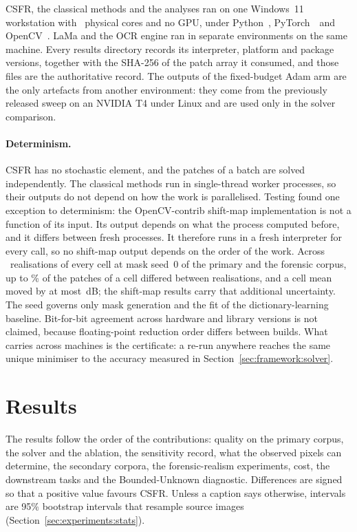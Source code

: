 \documentclass[final,3p]{elsarticle}
\begin{document}
CSFR, the classical methods and the analyses ran on one Windows~11 workstation with \envCores\ physical cores and no GPU, under Python~\envPython, PyTorch~\envTorch\ and OpenCV~\envOpencv. LaMa and the OCR engine ran in separate environments on the same machine. Every results directory records its interpreter, platform and package versions, together with the SHA-256 of the patch array it consumed, and those files are the authoritative record. The outputs of the fixed-budget Adam arm are the only artefacts from another environment: they come from the previously released sweep on an NVIDIA T4 under Linux and are used only in the solver comparison.

\paragraph{Determinism.} CSFR has no stochastic element, and the patches of a batch are solved independently. The classical methods run in single-thread worker processes, so their outputs do not depend on how the work is parallelised. Testing found one exception to determinism: the OpenCV-contrib shift-map implementation is not a function of its input. Its output depends on what the process computed before, and it differs between fresh processes. It therefore runs in a fresh interpreter for every call, so no shift-map output depends on the order of the work. Across \shiftmapRealisations\ realisations of every cell at mask seed~0 of the primary and the forensic corpus, up to \shiftmapDifferMax\% of the patches of a cell differed between realisations, and a cell mean moved by at most \shiftmapCellRangeMax\,dB; the shift-map results carry that additional uncertainty. The seed governs only mask generation and the fit of the dictionary-learning baseline. Bit-for-bit agreement across hardware and library versions is not claimed, because floating-point reduction order differs between builds. What carries across machines is the certificate: a re-run anywhere reaches the same unique minimiser to the accuracy measured in Section~\ref{sec:framework:solver}.

\section{Results}
\label{sec:results}

The results follow the order of the contributions: quality on the primary corpus, the solver and the ablation, the sensitivity record, what the observed pixels can determine, the secondary corpora, the forensic-realism experiments, cost, the downstream tasks and the Bounded-Unknown diagnostic. Differences are signed so that a positive value favours CSFR. Unless a caption says otherwise, intervals are 95\% bootstrap intervals that resample source images (Section~\ref{sec:experiments:stats}).
\end{document}
